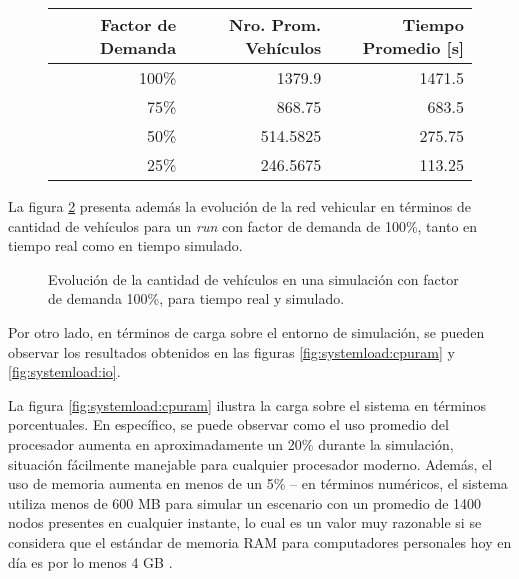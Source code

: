 \begin{figure}[htpb]
    \centering
    \begin{tabular}{@{}rrr@{}}
        \textbf{Factor de Demanda} & \textbf{Nro. Prom. Vehículos} & \textbf{Tiempo Promedio [s]} \\ \midrule
        100\%           & 1379.9          & 1471.5              \\ %
        75\%            & 868.75          & 683.5               \\ %
        50\%            & 514.5825        & 275.75              \\ %
        25\%            & 246.5675        & 113.25              \\ \bottomrule
    \end{tabular}
    \label{table:vehiclesvstime}
    
    
    
    \label{fig:vehiclesvstime}
\end{figure}

La figura \ref{fig:timevsvehicles_evolution} presenta además la evolución de la red vehicular en términos de cantidad de vehículos para un \emph{run} con factor de demanda de 100\%, tanto en tiempo real como en tiempo simulado. 

\begin{figure}[h]
    \centering
    
    \caption{Evolución de la cantidad de vehículos en una simulación con factor de demanda 100\%, para tiempo real y simulado.}
    \label{fig:timevsvehicles_evolution}
\end{figure}

Por otro lado, en términos de carga sobre el entorno de simulación, se pueden observar los resultados obtenidos en las figuras \ref{fig:systemload:cpuram} y \ref{fig:systemload:io}. 

La figura \ref{fig:systemload:cpuram} ilustra la carga sobre el sistema en términos porcentuales. En específico, se puede observar como el uso promedio del procesador aumenta en aproximadamente un 20\% durante la simulación, situación fácilmente manejable para cualquier procesador moderno. Además, el uso de memoria aumenta en menos de un 5\% -- en términos numéricos, el sistema utiliza menos de 600 MB para simular un escenario con un promedio de 1400 nodos presentes en cualquier instante, lo cual es un valor muy razonable si se considera que el estándar de memoria RAM para computadores personales hoy en día es por lo menos 4 GB \autocite{steamhwsurvey, unityhardwaresurvey}.

